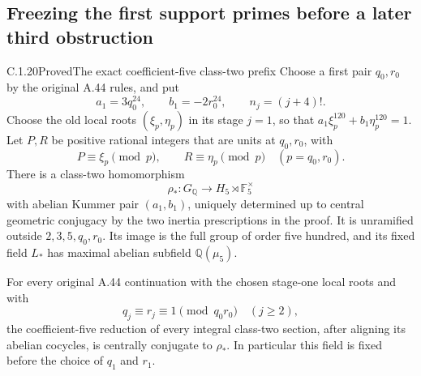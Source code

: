 \subsection{Freezing the first support primes before a later third obstruction}
\label{sec:ghost-prefix-class3}

\begin{result}{C.1.20}{Proved}{The exact coefficient-five class-two prefix}
\label{lem:ghost-prefix-five}
Choose a first pair \(q_0,r_0\) by the original A.44
rules, and put
\[
 a_1=3q_0^{24},\qquad b_1=-2r_0^{24},\qquad
 n_j=(j+4)!.
                                                        \tag{45}
\]
Choose the old local roots \((\xi_p,\eta_p)\) in its
stage \(j=1\), so that
\(a_1\xi_p^{120}+b_1\eta_p^{120}=1\).
Let \(P,R\) be positive rational integers that are
units at \(q_0,r_0\), with
\[
 P\equiv\xi_p\pmod p,\qquad
 R\equiv\eta_p\pmod p
                \quad(p=q_0,r_0).                    \tag{46}
\]
There is a class-two homomorphism
\[
 \rho_*:G_{\mathbb Q}\longrightarrow
     H_5\rtimes\mathbb F_5^\times
                                                        \tag{47}
\]
with abelian Kummer pair \((a_1,b_1)\), uniquely
determined up to central geometric conjugacy by the
two inertia prescriptions in the proof. It is
unramified outside \(2,3,5,q_0,r_0\). Its image is
the full group of order five hundred, and its fixed
field \(L_*\) has maximal abelian subfield
\(\mathbb Q(\mu_5)\).

For every original A.44 continuation with the chosen
stage-one local roots and with
\[
 q_j\equiv r_j\equiv1\pmod{q_0r_0}
                       \quad(j\ge2),                 \tag{48}
\]
the coefficient-five reduction of every integral
class-two section, after aligning its abelian
cocycles, is centrally conjugate to \(\rho_*\).
In particular this field is fixed before the choice
of \(q_1\) and \(r_1\).
\end{result}
